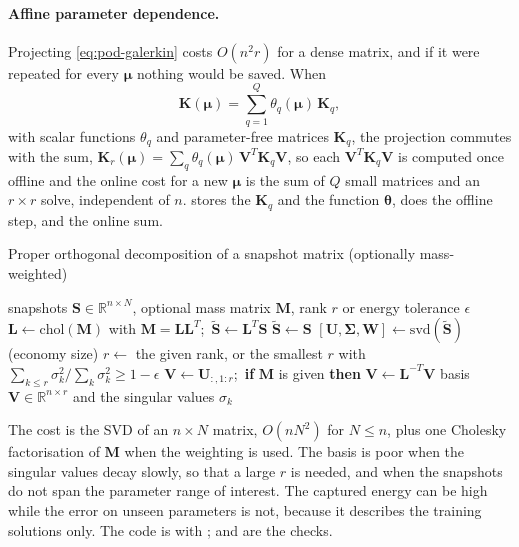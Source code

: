 
\paragraph{Affine parameter dependence.}
Projecting \eqref{eq:pod-galerkin} costs $O(n^2r)$ for a dense matrix, and if it were repeated for every $\bm\mu$ nothing would be saved. When
\begin{equation}\label{eq:pod-affine}
\bm K(\bm\mu)=\sum_{q=1}^{Q}\theta_q(\bm\mu)\,\bm K_q,
\end{equation}
with scalar functions $\theta_q$ and parameter-free matrices $\bm K_q$, the projection commutes with the sum, $\bm K_r(\bm\mu)=\sum_q\theta_q(\bm\mu)\,\bm V^T\bm K_q\bm V$, so each $\bm V^T\bm K_q\bm V$ is computed once offline and the online cost for a new $\bm\mu$ is the sum of $Q$ small matrices and an $r\times r$ solve, independent of $n$.  stores the $\bm K_q$ and the function $\bm\theta$,  does the offline step, and  the online sum.

\begin{algbox}{Proper orthogonal decomposition of a snapshot matrix (optionally mass-weighted)}
\begin{pseudo}
\Require snapshots $\bm S\in\mathbb R^{n\times N}$, optional mass matrix $\bm M$, rank $r$ or energy tolerance $\epsilon$
  \State $\bm L\gets\mathrm{chol}(\bm M)$ with $\bm M=\bm L\bm L^T$;\ $\tilde{\bm S}\gets\bm L^T\bm S$
\Else
  \State $\tilde{\bm S}\gets\bm S$
\EndIf
\State $[\bm U,\bm\Sigma,\bm W]\gets\mathrm{svd}(\tilde{\bm S})$ (economy size)
\State $r\gets$ the given rank, or the smallest $r$ with $\sum_{k\le r}\sigma_k^2/\sum_k\sigma_k^2\ge1-\epsilon$
\State $\bm V\gets\bm U_{:,1:r}$;\ \textbf{if} $\bm M$ is given \textbf{then} $\bm V\gets\bm L^{-T}\bm V$ 
\Ensure basis $\bm V\in\mathbb R^{n\times r}$ and the singular values $\sigma_k$
\end{pseudo}
\end{algbox}

The cost is the SVD of an $n\times N$ matrix, $O(nN^2)$ for $N\le n$, plus one Cholesky factorisation of $\bm M$ when the weighting is used. The basis is poor when the singular values decay slowly, so that a large $r$ is needed, and when the snapshots do not span the parameter range of interest. The captured energy can be high while the error on unseen parameters is not, because it describes the training solutions only. The code is  with ;  and  are the checks.


